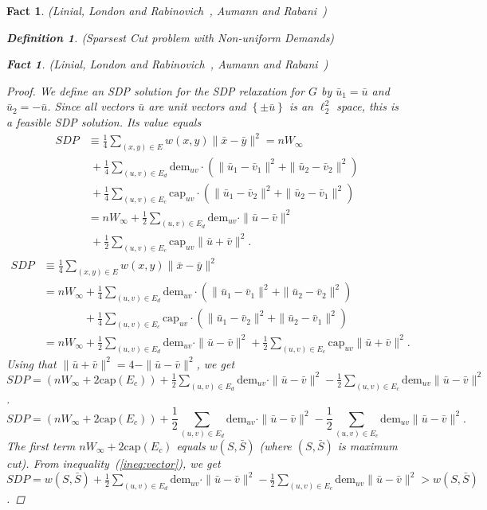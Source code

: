 \documentclass[twoside,leqno,twocolumn]{article}
\newcommand {\set}   [1] {\left\{ #1 \right\}}
\newtheorem{Definition}[theorem]{Definition}
\newtheorem{fact}[theorem]{Fact}
\begin{document}
\begin{fact}{\sc (Linial, London and Rabinovich~\cite{LLR}, Aumann and Rabani~\cite{AR})}
\begin{Definition} {\sc (Sparsest Cut problem with Non-uniform Demands)}
\begin{fact}{\sc (Linial, London and Rabinovich~\cite{LLR}, Aumann and Rabani~\cite{AR})}
\begin{proof}
We define an SDP solution for the SDP relaxation for $G$ by $\bar u_1 = \bar u$ and $\bar u_2 = -\bar u$. Since all vectors $\bar u$ are unit vectors and 
$\set{\pm \bar u}$ is an $\ell_2^2$ space, this is a feasible SDP solution.
Its value equals
\ifSODA
\begin{align*}
SDP &\equiv \frac{1}{4} \sum_{(x,y) \in E} w(x,y) \|\bar x- \bar y\|^2 = n W_{\infty} \\
       &\ {} + \frac{1}{4} \sum_{(u,v) \in E_d} \mathrm{dem}_{uv} \cdot(\|\bar u_1- \bar v_1\|^2 + \|\bar u_2- \bar v_2\|^2) \\
       &\ {}+ \frac{1}{4} \sum_{(u,v) \in E_c} \mathrm{cap}_{uv} \cdot (\|\bar u_1- \bar v_2\|^2 + \|\bar u_2- \bar v_1\|^2)\\
       &= n W_{\infty} + \frac{1}{2} \sum_{(u,v) \in E_d} \mathrm{dem}_{uv} \cdot \|\bar u - \bar v\|^2  \\
       &\ + \frac{1}{2} \sum_{(u,v) \in E_c} \mathrm{cap}_{uv} \|\bar u + \bar v\|^2.
\end{align*}
\else
\begin{align*}
SDP &\equiv \frac{1}{4} \sum_{(x,y) \in E} w(x,y) \|\bar x- \bar y\|^2 \\
       &= n W_{\infty} + \frac{1}{4} \sum_{(u,v) \in E_d} \mathrm{dem}_{uv} \cdot(\|\bar u_1- \bar v_1\|^2 + \|\bar u_2- \bar v_2\|^2) \\
       &\phantom{{}= n W_{\infty}} {}+ \frac{1}{4} \sum_{(u,v) \in E_c} \mathrm{cap}_{uv} \cdot (\|\bar u_1- \bar v_2\|^2 + \|\bar u_2- \bar v_1\|^2)\\
       &= n W_{\infty} + \frac{1}{2} \sum_{(u,v) \in E_d} \mathrm{dem}_{uv} \cdot \|\bar u - \bar v\|^2  + \frac{1}{2} \sum_{(u,v) \in E_c} \mathrm{cap}_{uv} \|\bar u + \bar v\|^2.
\end{align*}
\fi
Using that $\|\bar u + \bar v\|^2 = 4- \|\bar u- \bar v\|^2$, we get 
\ifSODA
$SDP = (n W_{\infty} + 2 \mathrm{cap} (E_c)) +  \frac{1}{2}\sum_{(u,v) \in E_d} \mathrm{dem}_{uv} \cdot \|\bar u - \bar v\|^2 -  \frac{1}{2}\sum_{(u,v) \in E_c} \mathrm{dem}_{uv} \|\bar u - \bar v\|^2$.
\else
$$SDP = (n W_{\infty} + 2 \mathrm{cap} (E_c)) +  \frac{1}{2}\sum_{(u,v) \in E_d} \mathrm{dem}_{uv} \cdot \|\bar u - \bar v\|^2 -  \frac{1}{2}\sum_{(u,v) \in E_c} \mathrm{dem}_{uv} \|\bar u - \bar v\|^2.$$
\fi
The first term $n W_{\infty} + 2 \mathrm{cap} (E_c)$ equals $w(S,\bar S)$ (where $(S,\bar S)$ is maximum cut).
From inequality~(\ref{ineq:vector}), we get 
\ifSODA
$SDP = w(S, \bar S) +  \frac{1}{2}\sum_{(u,v) \in E_d} \mathrm{dem}_{uv} \cdot \|\bar u - \bar v\|^2 -  \frac{1}{2}\sum_{(u,v) \in E_c} \mathrm{dem}_{uv} \|\bar u - \bar v\|^2 > w(S,\bar S)$.

\end{proof}
\end{fact}
\end{Definition}
\end{fact}
\end{document}
